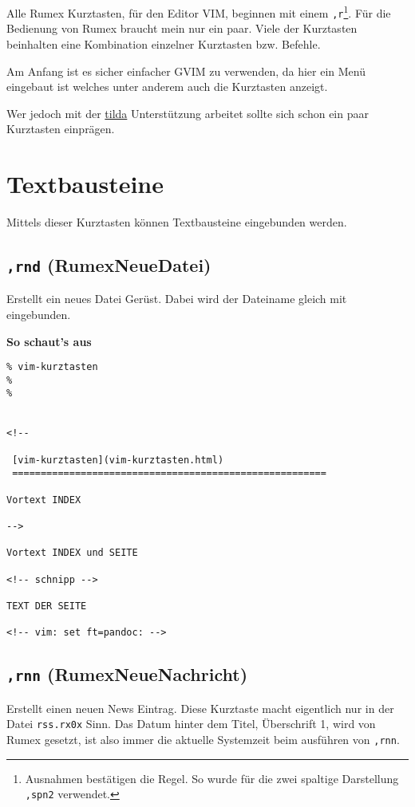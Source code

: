 Alle Rumex Kurztasten, für den Editor VIM, beginnen mit einem
\texttt{,r}\footnote{Ausnahmen bestätigen die Regel. So wurde für die
  zwei spaltige Darstellung\\\texttt{,spn2} verwendet.}. Für die
Bedienung von Rumex braucht mein nur ein paar. Viele der Kurztasten
beinhalten eine Kombination einzelner Kurztasten bzw. Befehle.

Am Anfang ist es sicher einfacher GVIM zu verwenden, da hier ein Menü
eingebaut ist welches unter anderem auch die Kurztasten anzeigt.

Wer jedoch mit der
\href{beschreibung.html\#homepage-änderung-schnell-und-immer-aktuell}{tilda}
Unterstützung arbeitet sollte sich schon ein paar Kurztasten einprägen.

\section{Textbausteine}\label{textbausteine}

Mittels dieser Kurztasten können Textbausteine eingebunden werden.

\subsection{\texttt{,rnd} (RumexNeueDatei)}\label{rnd-rumexneuedatei}

Erstellt ein neues Datei Gerüst. Dabei wird der Dateiname gleich mit
eingebunden.

\textbf{So schaut's aus}

\begin{verbatim}
% vim-kurztasten
%
%


<!--

 [vim-kurztasten](vim-kurztasten.html)
 =======================================================

Vortext INDEX

-->

Vortext INDEX und SEITE

<!-- schnipp -->

TEXT DER SEITE

<!-- vim: set ft=pandoc: -->
\end{verbatim}

\subsection{\texttt{,rnn}
(RumexNeueNachricht)}\label{rnn-rumexneuenachricht}

Erstellt einen neuen News Eintrag. Diese Kurztaste macht eigentlich nur
in der Datei \texttt{rss.rx0x} Sinn. Das Datum hinter dem Titel,
Überschrift 1, wird von Rumex gesetzt, ist also immer die aktuelle
Systemzeit beim ausführen von \texttt{,rnn}.

